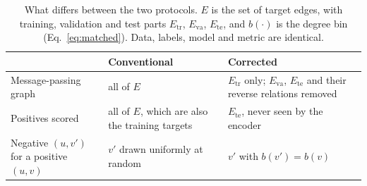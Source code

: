 \begin{table}[h!]
\caption{What differs between the two protocols. $E$ is the set of target edges, with training, validation and test parts $E_{\mathrm{tr}}$, $E_{\mathrm{va}}$, $E_{\mathrm{te}}$, and $b(\cdot)$ is the degree bin (Eq.~\ref{eq:matched}). Data, labels, model and metric are identical.}
\label{tab:protocol_arms}
\small
\begin{tabular}{p{3.4cm}p{4.2cm}p{5.2cm}}
\hline
 & Conventional & Corrected \\
\hline
Message-passing graph & all of $E$ & $E_{\mathrm{tr}}$ only; $E_{\mathrm{va}}$, $E_{\mathrm{te}}$ and their reverse relations removed \\
Positives scored & all of $E$, which are also the training targets & $E_{\mathrm{te}}$, never seen by the encoder \\
Negative $(u,v')$ for a positive $(u,v)$ & $v'$ drawn uniformly at random & $v'$ with $b(v')=b(v)$ \\
\hline
\end{tabular}
\end{table}
